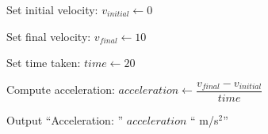 \begin{algorithm}
\caption{Calculate Acceleration of a Car}
\begin{algorithmic}[1]

\STATE Set initial velocity:
\STATE $v_{initial} \gets 0$

\STATE Set final velocity:
\STATE $v_{final} \gets 10$

\STATE Set time taken:
\STATE $time \gets 20$

\STATE Compute acceleration:
\STATE $acceleration \gets \dfrac{v_{final}-v_{initial}}{time}$

\STATE Output ``Acceleration: '' $acceleration$ `` m/s$^2$''

\end{algorithmic}
\end{algorithm}